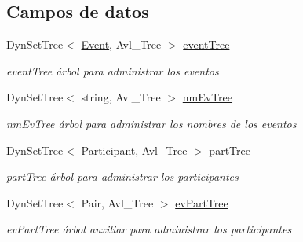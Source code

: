 \subsection*{Campos de datos}
\begin{DoxyCompactItemize}
\item 
Dyn\+Set\+Tree$<$ \hyperlink{class_event}{Event}, Avl\+\_\+\+Tree $>$ \hyperlink{class_main_window_adb0e2b6f47127b9bf6abea1f234cfd3a}{event\+Tree}\hypertarget{class_main_window_adb0e2b6f47127b9bf6abea1f234cfd3a}{}\label{class_main_window_adb0e2b6f47127b9bf6abea1f234cfd3a}

\begin{DoxyCompactList}\small\item\em event\+Tree árbol para administrar los eventos \end{DoxyCompactList}\item 
Dyn\+Set\+Tree$<$ string, Avl\+\_\+\+Tree $>$ \hyperlink{class_main_window_a12d4a98331022567be84fad64e556e2b}{nm\+Ev\+Tree}\hypertarget{class_main_window_a12d4a98331022567be84fad64e556e2b}{}\label{class_main_window_a12d4a98331022567be84fad64e556e2b}

\begin{DoxyCompactList}\small\item\em nm\+Ev\+Tree árbol para administrar los nombres de los eventos \end{DoxyCompactList}\item 
Dyn\+Set\+Tree$<$ \hyperlink{class_participant}{Participant}, Avl\+\_\+\+Tree $>$ \hyperlink{class_main_window_a905cefa1acba5185f4b4957b3827612a}{part\+Tree}\hypertarget{class_main_window_a905cefa1acba5185f4b4957b3827612a}{}\label{class_main_window_a905cefa1acba5185f4b4957b3827612a}

\begin{DoxyCompactList}\small\item\em part\+Tree árbol para administrar los participantes \end{DoxyCompactList}\item 
Dyn\+Set\+Tree$<$ Pair, Avl\+\_\+\+Tree $>$ \hyperlink{class_main_window_adb9534da17289cfe78255e4789d08fa6}{ev\+Part\+Tree}\hypertarget{class_main_window_adb9534da17289cfe78255e4789d08fa6}{}\label{class_main_window_adb9534da17289cfe78255e4789d08fa6}

\begin{DoxyCompactList}\small\item\em ev\+Part\+Tree árbol auxiliar para administrar los participantes \end{DoxyCompactList}\end{DoxyCompactItemize}


